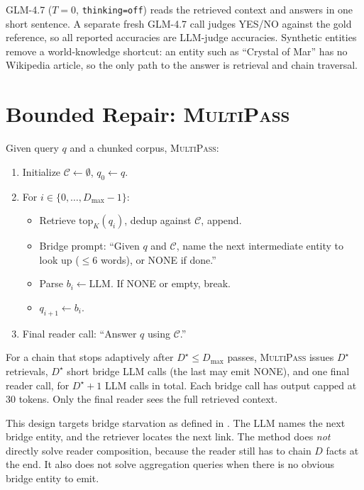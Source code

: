 \documentclass{article}
\theoremstyle{plain}
\theoremstyle{definition}
\newcommand{\ours}{\textsc{MultiPass}}
\begin{document}
GLM-4.7 ($T{=}0$, \texttt{thinking=off}) reads the retrieved context and
answers in one short sentence. A separate fresh GLM-4.7 call judges YES/NO
against the gold reference, so all reported accuracies are LLM-judge
accuracies. Synthetic entities remove a world-knowledge shortcut: an entity
such as ``Crystal of Mar'' has no Wikipedia article, so the only path to
the answer is retrieval and chain traversal.

\section{Bounded Repair: \ours{}}\label{sec:method}

Given query $q$ and a chunked corpus, \ours{}:
\begin{enumerate}\setlength{\itemsep}{0.05em}
  \item Initialize $\mathcal{C}\gets\emptyset$, $q_0\gets q$.
  \item For $i \in \{0,\ldots,D_{\max}{-}1\}$:
    \begin{itemize}\setlength{\itemsep}{0.05em}
      \item Retrieve $\mathrm{top}_K(q_i)$, dedup against $\mathcal{C}$,
            append.
      \item Bridge prompt: ``Given $q$ and $\mathcal{C}$, name the next
            intermediate entity to look up ($\le 6$ words), or NONE if done.''
      \item Parse $b_i \gets \mathrm{LLM}$. If NONE or empty, break.
      \item $q_{i+1} \gets b_i$.
    \end{itemize}
  \item Final reader call: ``Answer $q$ using $\mathcal{C}$.''
\end{enumerate}

For a chain that stops adaptively after $D^\star \le D_{\max}$ passes,
\ours{} issues $D^\star$ retrievals, $D^\star$ short bridge LLM calls
(the last may emit NONE), and one final reader call, for $D^\star{+}1$
LLM calls in total. Each bridge call has output capped at 30 tokens. Only
the final reader sees the full retrieved context.

This design targets bridge starvation as defined in . The
LLM names the next bridge entity, and the retriever locates the next link.
The method does \emph{not} directly solve reader composition, because the
reader still has to chain $D$ facts at the end. It also does not solve
aggregation queries when there is no obvious bridge entity to emit.
\end{document}

